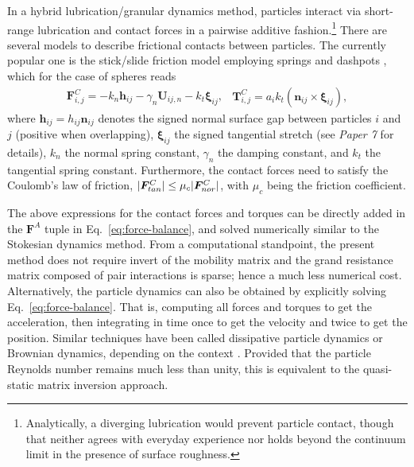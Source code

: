 In a hybrid lubrication/granular dynamics method, particles interact via short-range lubrication and contact forces in a pairwise additive fashion.\footnote{Analytically, a diverging lubrication would prevent particle contact, though that neither agrees with everyday experience nor holds beyond the continuum limit in the presence of surface roughness.}
There are several models to describe frictional contacts between particles. The currently popular one is the 
stick/slide friction model employing springs and dashpots \citep{Luding2008}, which for the case of spheres reads
\begin{subequations} \label{eq:hlcd-contact}
  \begin{equation} 
    \begin{aligned}
      {\bm F}^C_{i,j} = -k_n {\bm h}_{ij}  - \gamma_n \bm{U}_{ij,n} - k_t {\bm \xi}_{ij},
    \end{aligned}
    \label{col F}
  \end{equation}
  \begin{equation} 
    \begin{aligned}
      {\bm T}^C_{i,j} = a_{i} k_t ({\bm n}_{ij} \times {\bm \xi}_{ij}),
    \end{aligned}
  \end{equation}
\end{subequations}
where ${\bm h}_{ij}=h_{ij}{\bm n}_{ij}$ denotes the signed normal surface gap between particles $i$ and $j$ (positive when overlapping),
${\bm \xi}_{ij}$ the signed tangential stretch (see \emph{Paper 7} for details),
$k_n$ the normal spring constant,
$\gamma_n$ the damping constant,
and $k_t$ the tangential spring constant.
Furthermore, the contact forces need to satisfy the Coulomb's law of friction, \ie $\lvert\bm{F}^C_{tan}\rvert \leq \mu_c\lvert\bm{F}^C_{nor}\rvert$, with $\mu_c$ being the friction coefficient. 

The above expressions for the contact forces and torques can be directly added in the ${\bm F}^A$ tuple in Eq.\ \eqref{eq:force-balance}, and solved numerically similar to the Stokesian dynamics method.
From a computational standpoint, the present method does not require invert of the mobility matrix and the grand resistance matrix composed of pair interactions is sparse; hence a much less numerical cost.
Alternatively, the particle dynamics can also be obtained by explicitly solving Eq.\ \eqref{eq:force-balance}. That is, computing all forces and torques to get the acceleration, then integrating in time once to get the velocity and twice to get the position.
Similar techniques have been called dissipative particle dynamics or Brownian dynamics, depending on the context \citep{Hoogerbrugge_1992, Groot_Warren_1997}.
Provided that the particle Reynolds number remains much less than unity, this is equivalent to the quasi-static matrix inversion approach.



